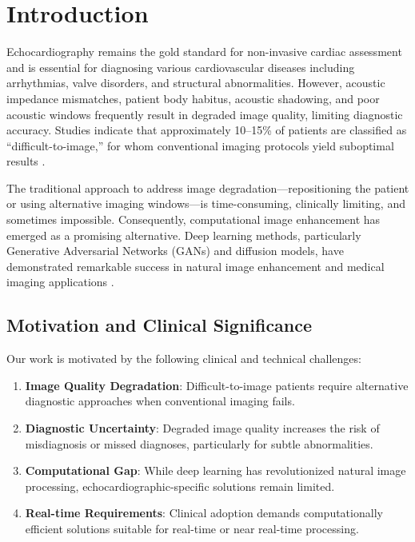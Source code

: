 \documentclass[10pt,conference,letterpaper]{IEEEtran}
\begin{document}
\IEEEpeerreviewmaketitle

\section{Introduction}
\label{sec:introduction}

Echocardiography remains the gold standard for non-invasive cardiac assessment and is essential for diagnosing various cardiovascular diseases including arrhythmias, valve disorders, and structural abnormalities. However, acoustic impedance mismatches, patient body habitus, acoustic shadowing, and poor acoustic windows frequently result in degraded image quality, limiting diagnostic accuracy. Studies indicate that approximately 10--15\% of patients are classified as ``difficult-to-image,'' for whom conventional imaging protocols yield suboptimal results \cite{Echocardiography_Video_Synthesis_from_End_Diastolic_Semantic_Map_via_Diffusion_Model,EchoNet_Quality_Denoising_Echocardiograms}.

The traditional approach to address image degradation—repositioning the patient or using alternative imaging windows—is time-consuming, clinically limiting, and sometimes impossible. Consequently, computational image enhancement has emerged as a promising alternative. Deep learning methods, particularly Generative Adversarial Networks (GANs) and diffusion models, have demonstrated remarkable success in natural image enhancement and medical imaging applications \cite{Dehazing_Ultrasound_Using_Diffusion_Models}.

\subsection{Motivation and Clinical Significance}

Our work is motivated by the following clinical and technical challenges:

\begin{enumerate}
  \item \textbf{Image Quality Degradation}: Difficult-to-image patients require alternative diagnostic approaches when conventional imaging fails.
  
  \item \textbf{Diagnostic Uncertainty}: Degraded image quality increases the risk of misdiagnosis or missed diagnoses, particularly for subtle abnormalities.
  
  \item \textbf{Computational Gap}: While deep learning has revolutionized natural image processing, echocardiographic-specific solutions remain limited.
  
  \item \textbf{Real-time Requirements}: Clinical adoption demands computationally efficient solutions suitable for real-time or near real-time processing.
\end{enumerate}
\end{document}
